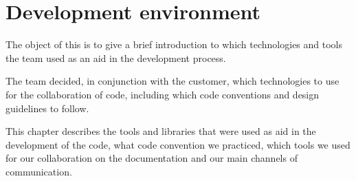 \chapter{Development environment}

The object of this is to give a brief introduction to which technologies and tools the team used as an aid in the development process.

The team decided, in conjunction with the customer, which technologies to use for the collaboration of code, including which code conventions and design guidelines to follow. 

This chapter describes the tools and libraries that were used as aid in the development of the code, what code convention we practiced, which tools we used for our collaboration on the documentation and our main channels of communication.

\newpage





